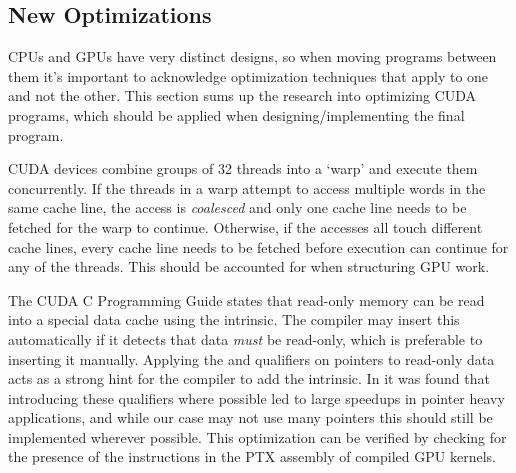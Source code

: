 \subsection{New Optimizations}
\label{sec:FutureOptimization}
CPUs and GPUs have very distinct designs, so when moving programs between them it's important to acknowledge optimization techniques that apply to one and not the other.
This section sums up the research into optimizing CUDA programs, which should be applied when designing/implementing the final program.

CUDA devices combine groups of 32 threads into a `warp' and execute them concurrently\cite{tool:CUDAProgrammingV1}.
If the threads in a warp attempt to access multiple words in the same cache line, the access is \textit{coalesced}\cite{NVIDIAHowBlog} and only one cache line needs to be fetched for the warp to continue.
Otherwise, if the accesses all touch different cache lines, every cache line needs to be fetched before execution can continue for any of the threads.
This should be accounted for when structuring GPU work.

The CUDA C Programming Guide\cite{NVIDIAGlobalGuide} states that read-only memory can be read into a special data cache using the  intrinsic.
The compiler may insert this automatically if it detects that data \emph{must} be read-only, which is preferable to inserting it manually.
Applying the  and  qualifiers on pointers to read-only data acts as a strong hint for the compiler to add the intrinsic.
In \cite{10.1145/3238147.3241533} it was found that introducing these qualifiers where possible led to large speedups in pointer heavy applications, and while our case may not use many pointers this should still be implemented wherever possible.
This optimization can be verified by checking for the presence of the \cite{NvidiaPTX} instructions in the PTX assembly of compiled GPU kernels.


